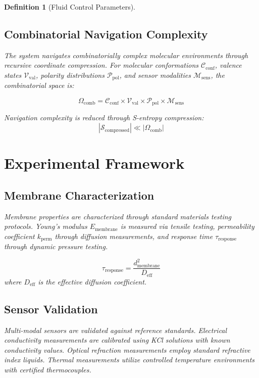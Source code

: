\documentclass[12pt,a4paper]{article}
\newtheorem{definition}{Definition}
\begin{document}
\begin{definition}[Fluid Control Parameters]
\subsection{Combinatorial Navigation Complexity}

The system navigates combinatorially complex molecular environments through recursive coordinate compression. For molecular conformations $\mathcal{C}_{\text{conf}}$, valence states $\mathcal{V}_{\text{val}}$, polarity distributions $\mathcal{P}_{\text{pol}}$, and sensor modalities $\mathcal{M}_{\text{sens}}$, the combinatorial space is:

\begin{equation}
\Omega_{\text{comb}} = \mathcal{C}_{\text{conf}} \times \mathcal{V}_{\text{val}} \times \mathcal{P}_{\text{pol}} \times \mathcal{M}_{\text{sens}}
\end{equation}

Navigation complexity is reduced through S-entropy compression:
\begin{equation}
|\mathcal{S}_{\text{compressed}}| \ll |\Omega_{\text{comb}}|
\end{equation}

\section{Experimental Framework}

\subsection{Membrane Characterization}

Membrane properties are characterized through standard materials testing protocols. Young's modulus $E_{\text{membrane}}$ is measured via tensile testing, permeability coefficient $k_{\text{perm}}$ through diffusion measurements, and response time $\tau_{\text{response}}$ through dynamic pressure testing.

\begin{equation}
\tau_{\text{response}} = \frac{d_{\text{membrane}}^2}{D_{\text{eff}}}
\end{equation}
where $D_{\text{eff}}$ is the effective diffusion coefficient.

\subsection{Sensor Validation}

Multi-modal sensors are validated against reference standards. Electrical conductivity measurements are calibrated using KCl solutions with known conductivity values. Optical refraction measurements employ standard refractive index liquids. Thermal measurements utilize controlled temperature environments with certified thermocouples.


\end{definition}
\end{document}

